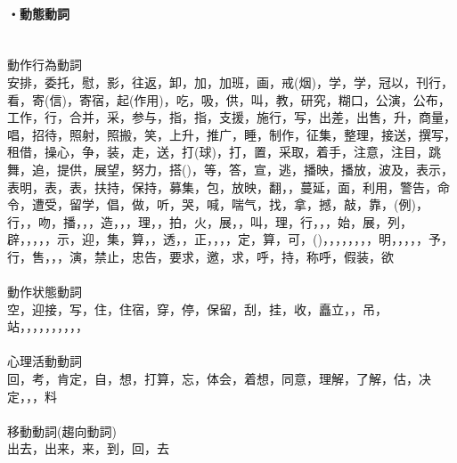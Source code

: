 \paragraph{・動態動詞}　\\
動作行為動詞\\
安排，委托，慰，影，往返，卸，加，加班，画，戒(烟)，学，学，冠以，刊行，看，寄(信)，寄宿，起(作用)，吃，吸，供，叫，教，研究，糊口，公演，公布，工作，行，合并，采，参与，指，指，支援，施行，写，出差，出售，升，商量，唱，招待，照射，照搬，笑，上升，推广，睡，制作，征集，整理，接送，撰写，租借，操心，争，装，走，送，打(球)，打，置，采取，着手，注意，注目，跳舞，追，提供，展望，努力，搭()，等，答，宣，逃，播映，播放，波及，表示，表明，表，表，扶持，保持，募集，包，放映，翻，，蔓延，面，利用，警告，命令，遭受，留学，倡，做，听，哭，喊，喘气，找，拿，撼，敲，靠，(例)，行，，吻，播，，，造，，，理，，拍，火，展，，叫，理，行，，，始，展，列，辟，，，，，示，迎，集，算，，透，，正，，，，定，算，可，()，，，，，，，，明，，，，，予，行，售，，，演，禁止，忠告，要求，邀，求，呼，持，称呼，假装，欲\\
\\
動作状態動詞\\
空，迎接，写，住，住宿，穿，停，保留，刮，挂，收，矗立，，吊，站，，，，，，，，，，\\
\\
心理活動動詞\\
回，考，肯定，自，想，打算，忘，体会，着想，同意，理解，了解，估，决定，，，料\\
\\
移動動詞(趨向動詞)\\
出去，出来，来，到，回，去

